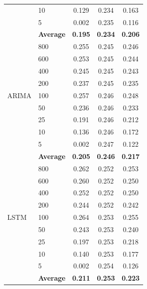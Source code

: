 \documentclass[11pt,a4paper]{article}
\begin{document}
\begin{table}[H]
\begin{tabular}{llccc}
 & 10  & 0.129 & 0.234 & 0.163 \\
 & 5   & 0.002 & 0.235 & 0.116 \\
 & \textbf{Average} & \textbf{0.195} & \textbf{0.234} & \textbf{0.206} \\
\midrule
\multirow{9}{*}{ARIMA}
 & 800 & 0.255 & 0.245 & 0.246 \\
 & 600 & 0.253 & 0.245 & 0.244 \\
 & 400 & 0.245 & 0.245 & 0.243 \\
 & 200 & 0.237 & 0.245 & 0.235 \\
 & 100 & 0.257 & 0.246 & 0.248 \\
 & 50  & 0.236 & 0.246 & 0.233 \\
 & 25  & 0.191 & 0.246 & 0.212 \\
 & 10  & 0.136 & 0.246 & 0.172 \\
 & 5   & 0.002 & 0.247 & 0.122 \\
 & \textbf{Average} & \textbf{0.205} & \textbf{0.246} & \textbf{0.217} \\
\midrule
\multirow{9}{*}{LSTM}
 & 800 & 0.262 & 0.252 & 0.253 \\
 & 600 & 0.260 & 0.252 & 0.250 \\
 & 400 & 0.252 & 0.252 & 0.250 \\
 & 200 & 0.244 & 0.252 & 0.242 \\
 & 100 & 0.264 & 0.253 & 0.255 \\
 & 50  & 0.243 & 0.253 & 0.240 \\
 & 25  & 0.197 & 0.253 & 0.218 \\
 & 10  & 0.140 & 0.253 & 0.177 \\
 & 5   & 0.002 & 0.254 & 0.126 \\
 & \textbf{Average} & \textbf{0.211} & \textbf{0.253} & \textbf{0.223} \\
\bottomrule
\end{tabular}
\end{table}
\end{document}
